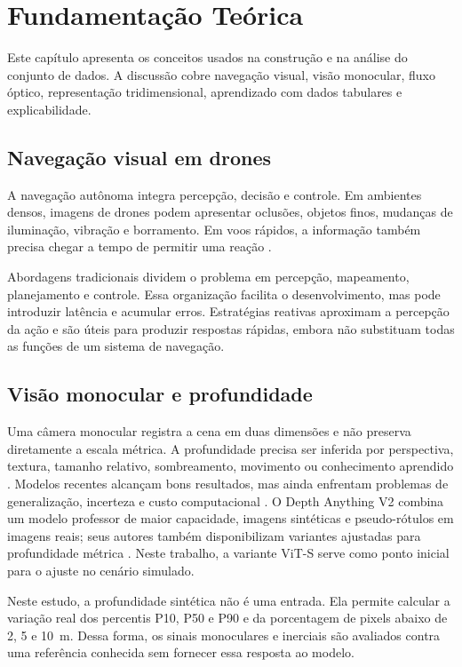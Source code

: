 \chapter{Fundamentação Teórica}\label{cap:fundamentacao}

Este capítulo apresenta os conceitos usados na construção e na análise do conjunto de dados. A discussão cobre navegação visual, visão monocular, fluxo óptico, representação tridimensional, aprendizado com dados tabulares e explicabilidade.

\section{Navegação visual em drones}

A navegação autônoma integra percepção, decisão e controle. Em ambientes densos, imagens de drones podem apresentar oclusões, objetos finos, mudanças de iluminação, vibração e borramento. Em voos rápidos, a informação também precisa chegar a tempo de permitir uma reação \cite{Loquercio2021,Ramachandran2021}.

Abordagens tradicionais dividem o problema em percepção, mapeamento, planejamento e controle. Essa organização facilita o desenvolvimento, mas pode introduzir latência e acumular erros. Estratégias reativas aproximam a percepção da ação e são úteis para produzir respostas rápidas, embora não substituam todas as funções de um sistema de navegação.

\section{Visão monocular e profundidade}

Uma câmera monocular registra a cena em duas dimensões e não preserva diretamente a escala métrica. A profundidade precisa ser inferida por perspectiva, textura, tamanho relativo, sombreamento, movimento ou conhecimento aprendido \cite{Vyas2022,Arampatzakis2024}. Modelos recentes alcançam bons resultados, mas ainda enfrentam problemas de generalização, incerteza e custo computacional \cite{RealTimeMonocular2022,Liu2023,Dhanushkodi2025}. O Depth Anything V2 combina um modelo professor de maior capacidade, imagens sintéticas e pseudo-rótulos em imagens reais; seus autores também disponibilizam variantes ajustadas para profundidade métrica \cite{DepthAnythingV2}. Neste trabalho, a variante ViT-S serve como ponto inicial para o ajuste no cenário simulado.

Neste estudo, a profundidade sintética não é uma entrada. Ela permite calcular a variação real dos percentis P10, P50 e P90 e da porcentagem de pixels abaixo de 2, 5 e 10~m. Dessa forma, os sinais monoculares e inerciais são avaliados contra uma referência conhecida sem fornecer essa resposta ao modelo.

